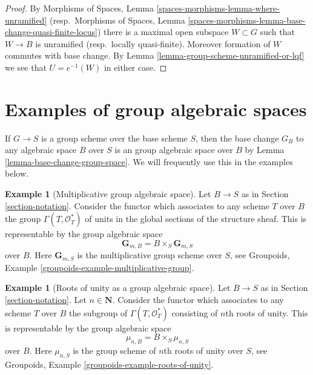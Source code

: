 \documentclass{stacks-project}
\theoremstyle{plain}
\theoremstyle{definition}
\newtheorem{example}[subsection]{Example}
\theoremstyle{remark}
\numberwithin{equation}{subsection}
\begin{document}
\begin{proof}
By Morphisms of Spaces, Lemma \ref{spaces-morphisms-lemma-where-unramified}
(resp.\ Morphisms of Spaces, Lemma
\ref{spaces-morphisms-lemma-base-change-quasi-finite-locus})
there is a maximal open subspace $W \subset G$ such that $W \to B$ is
unramified (resp.\ locally quasi-finite). Moreover formation of $W$
commutes with base change.
By Lemma \ref{lemma-group-scheme-unramified-or-lqf}
we see that $U = e^{-1}(W)$ in either case.
\end{proof}












\section{Examples of group algebraic spaces}
\label{section-examples-group-spaces}

\noindent
If $G \to S$ is a group scheme over the base scheme $S$, then the base
change $G_B$ to any algebraic space $B$ over $S$ is an group algebraic
space over $B$ by
Lemma \ref{lemma-base-change-group-space}.
We will frequently use this in the examples below.

\begin{example}[Multiplicative group algebraic space]
\label{example-multiplicative-group}
Let $B \to S$ as in Section \ref{section-notation}.
Consider the functor which associates to any scheme $T$ over
$B$ the group $\Gamma(T, \mathcal{O}_T^*)$
of units in the global sections of the structure sheaf.
This is representable by the group algebraic space
$$
\mathbf{G}_{m, B} = B \times_S \mathbf{G}_{m, S}
$$
over $B$. Here $\mathbf{G}_{m, S}$ is the multiplicative group scheme
over $S$, see
Groupoids, Example \ref{groupoids-example-multiplicative-group}.
\end{example}

\begin{example}[Roots of unity as a group algebraic space]
\label{example-roots-of-unity}
Let $B \to S$ as in Section \ref{section-notation}.
Let $n \in \mathbf{N}$. Consider the functor which associates
to any scheme $T$ over $B$ the subgroup of $\Gamma(T, \mathcal{O}_T^*)$
consisting of $n$th roots of unity.
This is representable by the group algebraic space
$$
\mu_{n, B} = B \times_S \mu_{n, S}
$$
over $B$. Here $\mu_{n, S}$ is the group scheme of $n$th roots of
unity over $S$, see
Groupoids, Example \ref{groupoids-example-roots-of-unity}.
\end{example}
\end{document}

